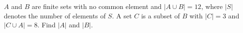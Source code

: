 $A$ and $B$ are finite sets with no common element and $|A\cup B|=12$, where $|S|$ denotes the number of elements of $S$. A set $C$ is a subset of $B$ with $|C|=3$ and $|C\cup A|=8$. Find $|A|$ and $|B|$.
